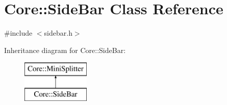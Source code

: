 \hypertarget{class_core_1_1_side_bar}{\section{\-Core\-:\-:\-Side\-Bar \-Class \-Reference}
\label{class_core_1_1_side_bar}
}


{\ttfamily \#include $<$sidebar.\-h$>$}

\-Inheritance diagram for \-Core\-:\-:\-Side\-Bar\-:\begin{figure}[H]
\begin{center}
\leavevmode
\includegraphics[height=2.000000cm]{class_core_1_1_side_bar}
\end{center}
\end{figure}
